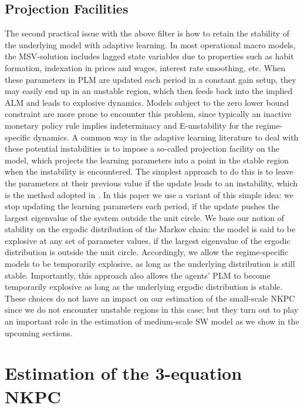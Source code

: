\documentclass[12pt,reqno]{article}
\numberwithin{equation}{section}
\begin{document}
\subsection{Projection Facilities} 

The second practical issue with the above filter is how to retain the stability of the underlying model with adaptive learning. In most operational macro models, the MSV-solution includes lagged state variables due to properties such as habit formation, indexation in prices and wages, interest rate smoothing, etc. When these parameters in PLM are updated each period in a constant gain setup, they may easily end up in an unstable region, which then feeds back into the implied ALM and leads to explosive dynamics. Models subject to the zero lower bound constraint are more prone to encounter this problem, since typically an inactive monetary policy  rule implies indeterminacy and E-unstability for the regime-specific dynamics. A common way in the adaptive learning literature to deal with these potential instabilities is to impose a so-called projection facility on the model, which projects the learning parameters into a point in the stable region when the instability is encountered. The simplest approach to do this is to leave the parameters at their previous value if the update leads to an instability, which is the method adopted in \cite{slobodyan2012blearning}. In this paper we use a variant of this simple idea: we stop updating the learning parameters each period, if the update pushes the largest eigenvalue of the system outside the unit circle. We base our notion of stability on the ergodic distribution of the Markov chain: the model is said to be explosive at any set of parameter values, if the largest eigenvalue of the ergodic distribution is outside the unit circle. Accordingly, we allow the regime-specific models to be temporarily explosive, as long as the underlying distribution is still stable. Importantly, this approach also allows the agents’ PLM to become temporarily explosive as long as the underlying ergodic distribution is stable. These choices do not have an impact on our estimation of the small-scale NKPC since we do not encounter unstable regions in this case; but they turn out to play an important role in the estimation of medium-scale SW model as we show in the upcoming sections. 


\section{Estimation of the 3-equation NKPC} 
\end{document}
